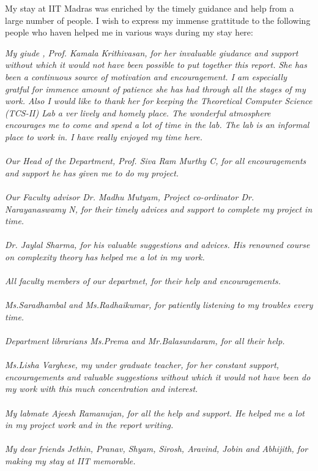 My stay at IIT Madras was enriched by the timely guidance and help from a large number of people. I wish to express my immense grattitude to the
following people who haven helped me in various ways during my stay here:

\emph
{
My giude , Prof. Kamala Krithivasan, for her invaluable giudance and support without which it would not have been possible to put together this report.
She has been a continuous source of motivation and encouragement. I am especially gratful for immence amount of patience she has had through all 
the stages of my work. Also I would like to thank her for keeping  the Theoretical Computer Science (TCS-II) Lab a ver lively and homely place. 
The wonderful atmosphere encourages me to come and spend a lot of time in the lab. The lab is an informal place to work in. I have really enjoyed my time 
here.\\\\
Our Head of the Department, Prof. Siva Ram Murthy C, for all encouragements and support he has given me to do my project.\\\\
Our Faculty advisor Dr. Madhu Mutyam, Project co-ordinator Dr. Narayanaswamy N, for their timely advices and support to complete my project in time.\\\\
Dr. Jaylal Sharma, for his valuable suggestions and advices. His renowned course on complexity theory has helped me a lot in my work.\\\\
All faculty members of our departmet, for their help and encouragements.\\\\
Ms.Saradhambal and Ms.Radhaikumar, for patiently listening to my troubles every time.\\\\
Department librarians Ms.Prema and Mr.Balasundaram, for all their help.\\\\
Ms.Lisha Varghese, my under graduate teacher, for her constant support, encouragements and valuable suggestions without which it would not have been 
do my work with this much concentration and interest. \\\\
My labmate Ajeesh Ramanujan, for all the help and support. He helped me a lot in my project work and in the report writing.\\\\
My dear friends Jethin, Pranav, Shyam, Sirosh, Aravind, Jobin and Abhijith, for making my stay at IIT memorable.\\\\
}
